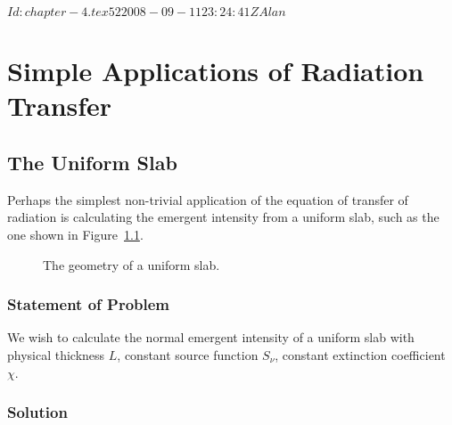 
\svnInfo $Id: chapter-4.tex 52 2008-09-11 23:24:41Z Alan $

\chapter{Simple Applications of Radiation Transfer}

\section{The Uniform Slab}
\label{section-uniform-slab}

Perhaps the simplest non-trivial application of the equation of transfer of radiation is calculating the emergent intensity from a uniform slab, such as the one shown in Figure~\ref{fig-uniform-slab}.

\begin{figure}[b]
\begin{center}
\end{center}
\caption{The geometry of a uniform slab.}
\label{fig-uniform-slab}
\end{figure}

\newslide

\subsection{Statement of Problem}

We wish to calculate the normal emergent intensity of a uniform slab with physical thickness $L$, constant source function $S_\nu$, constant extinction coefficient $\chi$.

\subsection{Solution}

